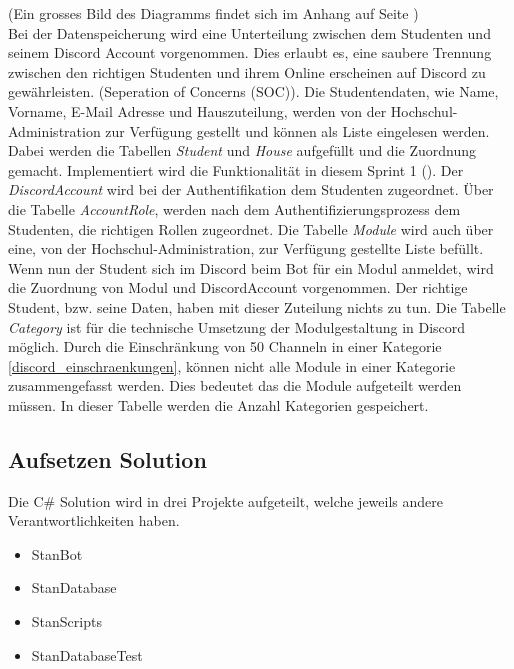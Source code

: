 \documentclass[a4paper, table]{article}
\begin{document}
(Ein grosses Bild des Diagramms findet sich im Anhang auf Seite \pageref*{fig:ER-Diagram-big})\\
Bei der Datenspeicherung wird eine Unterteilung zwischen dem Studenten und seinem Discord Account vorgenommen.
Dies erlaubt es, eine saubere Trennung zwischen den richtigen Studenten und ihrem Online erscheinen auf Discord zu gewährleisten.
(Seperation of Concerns (SOC)).
Die Studentendaten, wie Name, Vorname, E-Mail Adresse und Hauszuteilung, werden von der Hochschul-Administration zur Verfügung gestellt und können als Liste eingelesen werden.
Dabei werden die Tabellen \textit{Student} und \textit{House} aufgefüllt und die Zuordnung gemacht.
Implementiert wird die Funktionalität in diesem Sprint 1 ().
\newline
Der \textit{DiscordAccount} wird bei der Authentifikation dem Studenten zugeordnet.
Über die Tabelle \textit{AccountRole}, werden nach dem Authentifizierungsprozess dem Studenten, die richtigen Rollen zugeordnet.
\newline
Die Tabelle \textit{Module} wird auch über eine, von der Hochschul-Administration, zur Verfügung gestellte Liste befüllt.
Wenn nun der Student sich im Discord beim Bot für ein Modul anmeldet, wird die Zuordnung von Modul und DiscordAccount vorgenommen.
Der richtige Student, bzw. seine Daten, haben mit dieser Zuteilung nichts zu tun.
\newline
Die Tabelle \textit{Category} ist für die technische Umsetzung der Modulgestaltung in Discord möglich.
Durch die Einschränkung von 50 Channeln in einer Kategorie \ref{discord_einschraenkungen}, können nicht alle Module in einer Kategorie zusammengefasst werden.
Dies bedeutet das die Module aufgeteilt werden müssen.
In dieser Tabelle werden die Anzahl Kategorien gespeichert.

\subsection{Aufsetzen Solution}
Die C\# Solution wird in drei Projekte aufgeteilt, welche jeweils andere Verantwortlichkeiten haben.
\begin{itemize}
    \item StanBot
    \item StanDatabase
    \item StanScripts
    \item StanDatabaseTest
\end{itemize}
\end{document}
